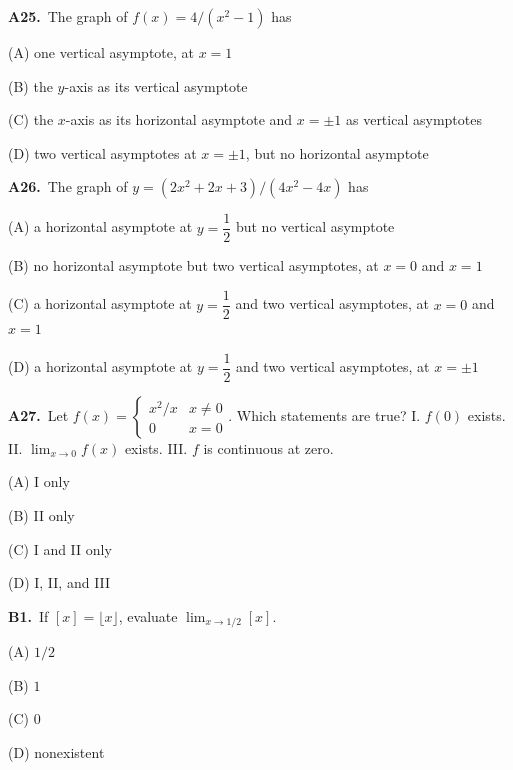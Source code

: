 \documentclass[11pt]{article}
\begin{document}
\bigskip\noindent\textbf{A25.}\ The graph of $f(x)=4/(x^2-1)$ has
\begin{list}{}{\setlength{\leftmargin}{3em}\setlength{\labelwidth}{2.5em}\setlength{\itemsep}{0pt}\setlength{\topsep}{2pt}}
\item[(A)] one vertical asymptote, at $x=1$
\item[(B)] the $y$-axis as its vertical asymptote
\item[(C)] the $x$-axis as its horizontal asymptote and $x=\pm1$ as vertical asymptotes
\item[(D)] two vertical asymptotes at $x=\pm1$, but no horizontal asymptote
\end{list}

\bigskip\noindent\textbf{A26.}\ The graph of $y=(2x^2+2x+3)/(4x^2-4x)$ has
\begin{list}{}{\setlength{\leftmargin}{3em}\setlength{\labelwidth}{2.5em}\setlength{\itemsep}{0pt}\setlength{\topsep}{2pt}}
\item[(A)] a horizontal asymptote at $y = \dfrac{1}{2}$ but no vertical asymptote
\item[(B)] no horizontal asymptote but two vertical asymptotes, at $x = 0$ and $x = 1$
\item[(C)] a horizontal asymptote at $y = \dfrac{1}{2}$ and two vertical asymptotes, at $x = 0$ and $x = 1$
\item[(D)] a horizontal asymptote at $y = \dfrac{1}{2}$ and two vertical asymptotes, at $x = \pm 1$
\end{list}

\bigskip\noindent\textbf{A27.}\ Let $f(x)=\begin{cases}x^2/x&x\ne0\\0&x=0\end{cases}$. Which statements are true? I. $f(0)$ exists. II. $\lim_{x\to0}f(x)$ exists. III. $f$ is continuous at zero.
\begin{list}{}{\setlength{\leftmargin}{3em}\setlength{\labelwidth}{2.5em}\setlength{\itemsep}{0pt}\setlength{\topsep}{2pt}}
\item[(A)] I only
\item[(B)] II only
\item[(C)] I and II only
\item[(D)] I, II, and III
\end{list}

\bigskip\noindent\textbf{B1.}\ If $[x]=\lfloor x\rfloor$, evaluate $\lim_{x\to1/2}[x]$.
\begin{list}{}{\setlength{\leftmargin}{3em}\setlength{\labelwidth}{2.5em}\setlength{\itemsep}{0pt}\setlength{\topsep}{2pt}}
\item[(A)] $1/2$
\item[(B)] $1$
\item[(C)] $0$
\item[(D)] nonexistent
\end{list}
\end{document}
